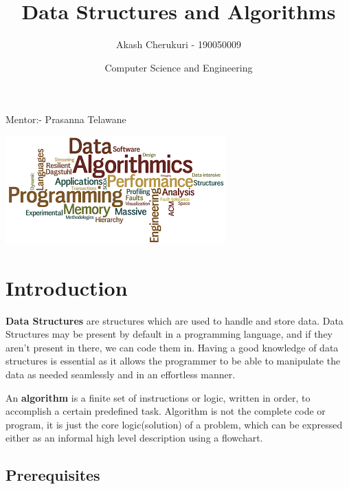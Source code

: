 \documentclass{article}
\title{\Huge \textbf{Data Structures and Algorithms}}
\author{\LARGE Akash Cherukuri - 190050009}
\date{\LARGE Computer Science and Engineering}
\theoremstyle{definition}
\theoremstyle{example}
\begin{document}
\maketitle

\begin{center}
    \LARGE
    \vspace{5mm}
    Mentor:- Prasanna Telawane
\end{center}

 \vspace{15mm}
 \hspace{-10mm}
    \includegraphics[scale = 1.5]{title.png}

\newpage
\Large
\tableofcontents
\newpage

\Large

\section{\Large Introduction}
\hspace{6mm} \textbf{Data Structures} are structures which are used to handle and store data. Data Structures may be present by default in a programming language, and if they aren't present in there, we can code them in. Having a good knowledge of data structures is essential as it allows the programmer to be able to manipulate the data as needed seamlessly and in an effortless manner.\par
\vspace{3.5mm}
An \textbf{algorithm} is a finite set of instructions or logic, written in order, to accomplish a certain predefined task. Algorithm is not the complete code or program, it is just the core logic(solution) of a problem, which can be expressed either as an informal high level description using a flowchart.

\subsection{\Large Prerequisites }
\end{document}
